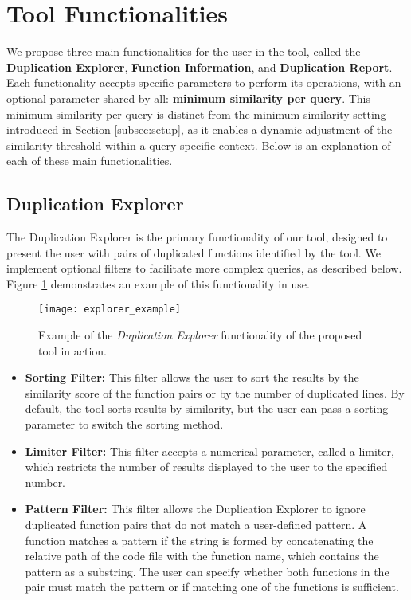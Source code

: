 \en

\section{Tool Functionalities}
\label{subsec:func}

We propose three main functionalities for the user in the tool, called the \textbf{Duplication Explorer}, \textbf{Function Information}, and \textbf{Duplication Report}. Each functionality accepts specific parameters to perform its operations, with an optional parameter shared by all: \textbf{minimum similarity per query}. This minimum similarity per query is distinct from the minimum similarity setting introduced in Section \ref{subsec:setup}, as it enables a dynamic adjustment of the similarity threshold within a query-specific context. Below is an explanation of each of these main functionalities.

\subsection{Duplication Explorer}

The Duplication Explorer is the primary functionality of our tool, designed to present the user with pairs of duplicated functions identified by the tool. We implement optional filters to facilitate more complex queries, as described below. Figure \ref{fig:explorer_ex} demonstrates an example of this functionality in use.

\begin{figure}
\texttt{[image: explorer\_example]}
\caption{Example of the \textit{Duplication Explorer} functionality of the proposed tool in action.}
\label{fig:explorer_ex}
\end{figure}

\begin{itemize}
	\item \textbf{Sorting Filter:} This filter allows the user to sort the results by the similarity score of the function pairs or by the number of duplicated lines. By default, the tool sorts results by similarity, but the user can pass a sorting parameter to switch the sorting method.

	\item \textbf{Limiter Filter:} This filter accepts a numerical parameter, called a limiter, which restricts the number of results displayed to the user to the specified number.

	\item \textbf{Pattern Filter:} This filter allows the Duplication Explorer to ignore duplicated function pairs that do not match a user-defined pattern. A function matches a pattern if the string is formed by concatenating the relative path of the code file with the function name, which contains the pattern as a substring. The user can specify whether both functions in the pair must match the pattern or if matching one of the functions is sufficient.
\end{itemize}

